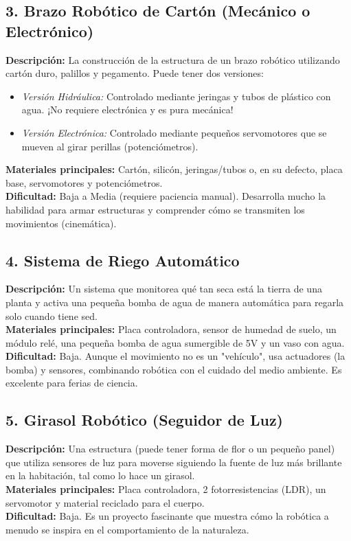 \documentclass[12pt,a4paper]{article}
\begin{document}
\subsection{3. Brazo Robótico de Cartón (Mecánico o Electrónico)}
\textbf{Descripción:} La construcción de la estructura de un brazo robótico utilizando cartón duro, palillos y pegamento. Puede tener dos versiones:
\begin{itemize}
    \item \textit{Versión Hidráulica:} Controlado mediante jeringas y tubos de plástico con agua. ¡No requiere electrónica y es pura mecánica!
    \item \textit{Versión Electrónica:} Controlado mediante pequeños servomotores que se mueven al girar perillas (potenciómetros).
\end{itemize}
\textbf{Materiales principales:} Cartón, silicón, jeringas/tubos o, en su defecto, placa base, servomotores y potenciómetros. \\
\textbf{Dificultad:} Baja a Media (requiere paciencia manual). Desarrolla mucho la habilidad para armar estructuras y comprender cómo se transmiten los movimientos (cinemática).

\subsection{4. Sistema de Riego Automático}
\textbf{Descripción:} Un sistema que monitorea qué tan seca está la tierra de una planta y activa una pequeña bomba de agua de manera automática para regarla solo cuando tiene sed. \\
\textbf{Materiales principales:} Placa controladora, sensor de humedad de suelo, un módulo relé, una pequeña bomba de agua sumergible de 5V y un vaso con agua. \\
\textbf{Dificultad:} Baja. Aunque el movimiento no es un "vehículo", usa actuadores (la bomba) y sensores, combinando robótica con el cuidado del medio ambiente. Es excelente para ferias de ciencia.

\subsection{5. Girasol Robótico (Seguidor de Luz)}
\textbf{Descripción:} Una estructura (puede tener forma de flor o un pequeño panel) que utiliza sensores de luz para moverse siguiendo la fuente de luz más brillante en la habitación, tal como lo hace un girasol. \\
\textbf{Materiales principales:} Placa controladora, 2 fotorresistencias (LDR), un servomotor y material reciclado para el cuerpo. \\
\textbf{Dificultad:} Baja. Es un proyecto fascinante que muestra cómo la robótica a menudo se inspira en el comportamiento de la naturaleza.
\end{document}
